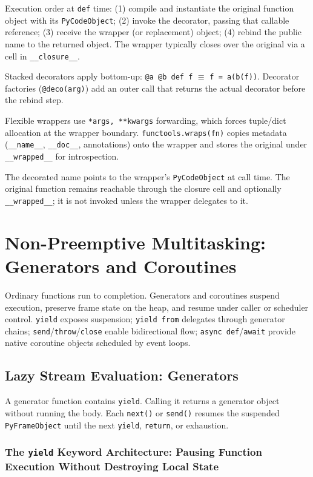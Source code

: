 \documentclass[a4paper,twoside]{report}
\begin{document}
Execution order at \texttt{def} time: (1) compile and instantiate the original function object with its \texttt{PyCodeObject}; (2) invoke the decorator, passing that callable reference; (3) receive the wrapper (or replacement) object; (4) rebind the public name to the returned object. The wrapper typically closes over the original via a cell in \texttt{\_\_closure\_\_}.

Stacked decorators apply bottom-up: \texttt{@a @b def f} $\equiv$ \texttt{f = a(b(f))}. Decorator factories (\texttt{@deco(arg)}) add an outer call that returns the actual decorator before the rebind step.

Flexible wrappers use \texttt{*args, **kwargs} forwarding, which forces tuple/dict allocation at the wrapper boundary. \texttt{functools.wraps(fn)} copies metadata (\texttt{\_\_name\_\_}, \texttt{\_\_doc\_\_}, annotations) onto the wrapper and stores the original under \texttt{\_\_wrapped\_\_} for introspection.

The decorated name points to the wrapper's \texttt{PyCodeObject} at call time. The original function remains reachable through the closure cell and optionally \texttt{\_\_wrapped\_\_}; it is not invoked unless the wrapper delegates to it.


\section{Non-Preemptive Multitasking: Generators and Coroutines}

Ordinary functions run to completion. Generators and coroutines suspend execution, preserve frame state on the heap, and resume under caller or scheduler control. \texttt{yield} exposes suspension; \texttt{yield from} delegates through generator chains; \texttt{send}/\texttt{throw}/\texttt{close} enable bidirectional flow; \texttt{async def}/\texttt{await} provide native coroutine objects scheduled by event loops.


\subsection{Lazy Stream Evaluation: Generators}

A generator function contains \texttt{yield}. Calling it returns a generator object without running the body. Each \texttt{next()} or \texttt{send()} resumes the suspended \texttt{PyFrameObject} until the next \texttt{yield}, \texttt{return}, or exhaustion.

\subsubsection{The \texttt{yield} Keyword Architecture: Pausing Function Execution Without Destroying Local State}
\end{document}
